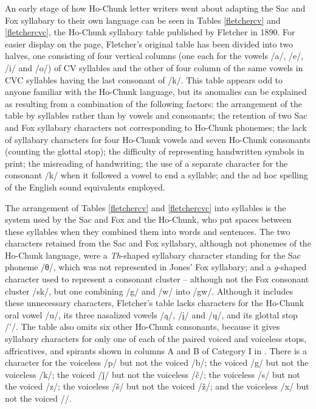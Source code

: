 \documentclass[output=paper]{LSP/langsci}
\begin{document}
An early stage of how Ho-Chunk letter writers went about adapting the Sac and Fox syllabary to their own language can be seen in Tables \ref{fletchercv} and \ref{fletchercvc}, the Ho-Chunk syllabary table published by Fletcher in 1890. For easier display on the page, Fletcher's original table has been divided into two halves, one consisting of four vertical columns (one each for the vowels /a/, /e/, /i/ and /o/) of CV syllables and the other of four column of the same vowels in CVC syllables having the last consonant of /k/. This table appears odd to anyone familiar with the Ho-Chunk language, but its anomalies can be explained as resulting from a combination of the following factors: the arrangement of the table by syllables rather than by vowels and consonants; the retention of two Sac and Fox syllabary characters not corresponding to Ho-Chunk phonemes; the lack of syllabary characters for four Ho-Chunk vowels and seven Ho-Chunk consonants (counting the glottal stop); the difficulty of  representing handwritten symbols in print; the misreading of handwriting; the use of a separate character for the consonant /k/ when it followed a vowel to end a syllable; and the ad hoc spelling of the English sound equivalents employed.

The arrangement of Tables \ref{fletchercv} and \ref{fletchercvc} into syllables is the system used by the Sac and Fox and the Ho-Chunk, who put spaces between these syllables when they combined them into words and sentences. The two characters retained from the Sac and Fox syllabary, although not phonemes of the Ho-Chunk language, were a \emph{Th}-shaped syllabary character standing for the Sac phoneme /θ/, which was not represented in Jones' Fox syllabary; and a \emph{g}-shaped character used to represent a consonant cluster -- although not the Fox consonant cluster /sk/, but one combining /g/ and /w/ into /gw/. Although it includes these unnecessary characters, Fletcher's table lacks characters for the Ho-Chunk oral vowel /u/, its three nasalized vowels /\k{a}/, /\k{i}/ and /\k{u}/, and its glottal stop /'/. The table also omits six other Ho-Chunk consonants, because it gives syllabary characters for only one of each of the paired voiced and voiceless stops, affricatives, and spirants shown in columns A and B of Category I in . There is a character for the voiceless /p/ but not the voiced /b/; the voiced /g/ but not the voiceless /k/; the voiced /ǰ/ but not the voiceless /\v{c}/; the voiceless /s/ but not the voiced /z/; the voiceless /\v{s}/ but not the voiced /\v{z}/; and the voiceless /x/ but not the voiced //. 
\end{document}
